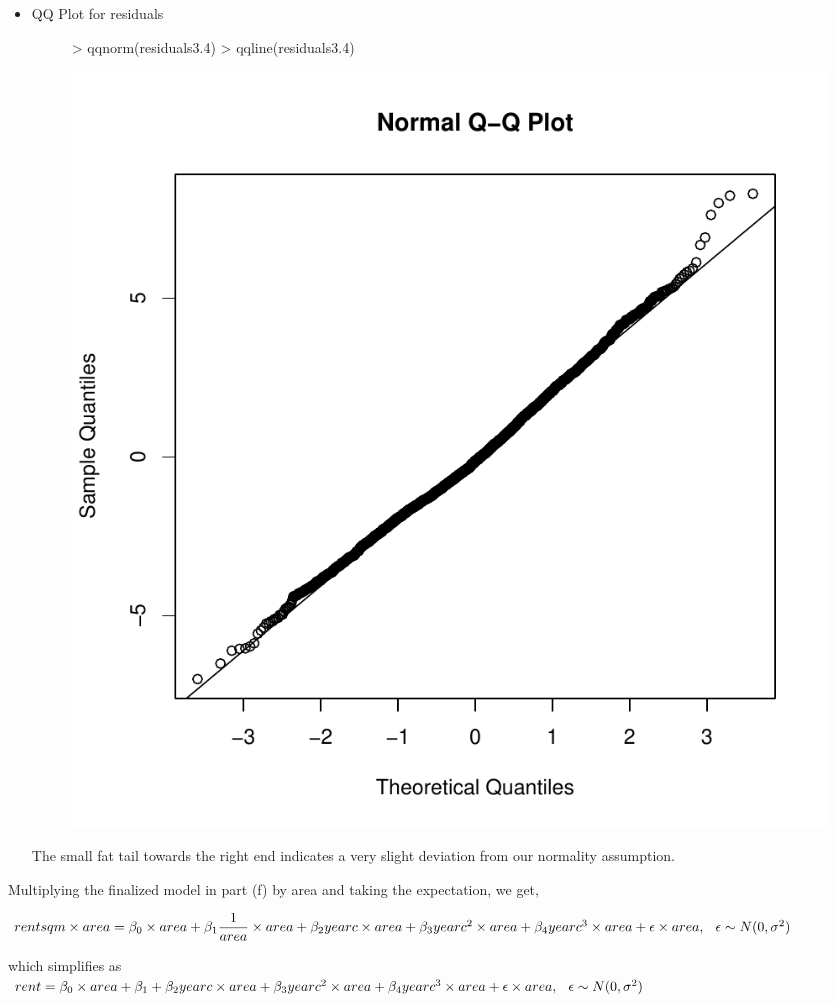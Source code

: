 \documentclass[12pt]{article}
\begin{document}
\begin{itemize}
\item QQ Plot for residuals
\begin{figure}[H]
\begin{Schunk}
\begin{Sinput}
> qqnorm(residuals3.4)
> qqline(residuals3.4)
\end{Sinput}
\end{Schunk}
\includegraphics{HW3-054}
\end{figure}
The small fat tail towards the right end indicates a very slight deviation from our normality assumption.
\end{itemize}

\item Multiplying the finalized model in part (f) by area and taking the expectation, we get,

$rentsqm \times area = \beta_0 \times area + \beta_1 \dfrac{1}{area} \times area + \beta_2 yearc \times area + \beta_3 yearc^2 \times area  + \beta_4 yearc^3 \times area + \epsilon \times area, \hspace{0.1in} \epsilon \sim N(0,\sigma^2)$

which simplifies as\\
$rent = \beta_0 \times area + \beta_1 + \beta_2 yearc \times area + \beta_3 yearc^2 \times area  + \beta_4 yearc^3 \times area + \epsilon \times area, \hspace{0.1in} \epsilon \sim N(0,\sigma^2)$
\end{document}
